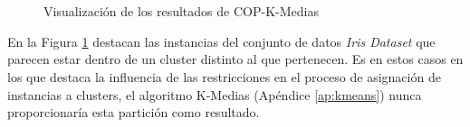 \begin{figure}[bth]
	\myfloatalign
	\\
	\\
	\caption{Visualización de los resultados de COP-K-Medias}\label{fig:figure24}
\end{figure}

En la Figura \ref{fig:figure24} destacan las instancias del conjunto de datos \textit{Iris Dataset} que parecen estar dentro de un cluster distinto al que pertenecen. Es en estos casos en los que destaca la influencia de las restricciones en el proceso de asignación de instancias a clusters, el algoritmo K-Medias (Apéndice \ref{ap:kmeans}) nunca proporcionaría esta partición como resultado.

